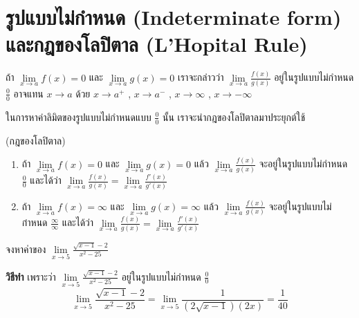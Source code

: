\documentclass[
]{book}
\begin{document}
\section{รูปแบบไม่กำหนด (Indeterminate form) และกฎของโลปิตาล (L'Hopital
Rule)}\label{uxe23uxe1buxe41uxe1auxe1auxe44uxe21uxe01uxe33uxe2buxe19uxe14-indeterminate-form-uxe41uxe25uxe30uxe01uxe0euxe02uxe2duxe07uxe42uxe25uxe1buxe15uxe32uxe25-lhopital-rule}

ถ้า \(\mathop {\lim }\limits_{x\to a} f(x)=0\) และ
\(\displaystyle \mathop
{\lim
}\limits_{x\to a} g(x)=0\) เราจะกล่าวว่า \(\displaystyle \mathop {\lim
}\limits_{x\to a}
\frac{f(x)}{g(x)}\) อยู่ในรูปแบบไม่กำหนด \(\displaystyle \frac{0}{0}\)
อาจแทน \(x\to a\) ด้วย \(x\to a^+\) , \(x\to a^-\) , \(x\to \infty\) ,
\(x\to -\infty\)

ในการหาค่าลิมิตของรูปแบบไม่กำหนดแบบ \(\displaystyle \frac{0}{0}\) นั้น
เราจะนำกฎของโลปิตาลมาประยุกต์ใช้

(กฎของโลปิตาล)\\

\begin{enumerate}
\def\labelenumi{\arabic{enumi}.}
\item
  ถ้า \(\mathop {\lim }\limits_{x\to a} f(x)=0\) และ \(\mathop {\lim
      }\limits_{x\to a} g(x)=0\) แล้ว
  \(\displaystyle \mathop {\lim }\limits_{x\to
      a}
      \frac{f(x)}{g(x)}\) จะอยู่ในรูปแบบไม่กำหนด
  \(\displaystyle \frac{0}{0}\) และได้ว่า
  \(\displaystyle \mathop {\lim }\limits_{x\to a}
      \frac{f(x)}{g(x)}=\mathop {\lim
      }\limits_{x\to a} \frac{{f}'(x)}{{g}'(x)}\)\\
\item
  ถ้า \(\mathop {\lim }\limits_{x\to a} f(x)=\infty\) และ \(\mathop {\lim
      }\limits_{x\to a} g(x)=\infty\) แล้ว \(\displaystyle \mathop {\lim
      }\limits_{x\to a}
      \frac{f(x)}{g(x)}\) จะอยู่ในรูปแบบไม่กำหนด
  \(\displaystyle \frac{\infty
      }{\infty }\) และได้ว่า
  \(\displaystyle \mathop {\lim }\limits_{x\to a}
      \frac{f(x)}{g(x)}=\mathop {\lim
      }\limits_{x\to a} \frac{{f}'(x)}{{g}'(x)}\)
\end{enumerate}

จงหาค่าของ \(\displaystyle \mathop {\lim }\limits_{x\to 5} \frac{\sqrt
{x-1}
-2}{x^2-25}\)

\textbf{วิธีทำ} เพราะว่า
\(\displaystyle \mathop {\lim }\limits_{x\to 5} \frac{\sqrt
{x-1}
-2}{x^2-25}\) อยู่ในรูปแบบไม่กำหนด \(\displaystyle \frac{0}{0}\)
\[\displaystyle \mathop {\lim }\limits_{x\to 5} \frac{\sqrt {x-1} 
-2}{x^2-25}=\mathop {\lim 
}\limits_{x\to 5} \frac{1}{(2\sqrt {x-1} )(2x)}=\frac{1}{40}\]
\end{document}
